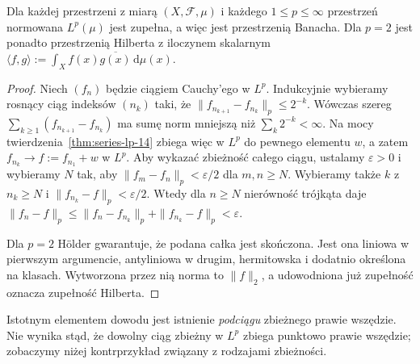 \begin{twierdzenie}
\label{thm:riesz-fischer-14}
Dla każdej przestrzeni z miarą $(X,\mathcal F,\mu)$
i każdego $1\le p\le\infty$ przestrzeń normowana
$L^p(\mu)$ jest zupełna, a więc jest przestrzenią Banacha.
Dla $p=2$ jest ponadto przestrzenią Hilberta
z iloczynem skalarnym
$\langle f,g\rangle:=\int_X f(x)\overline{g(x)}\,\mathrm d\mu(x)$.
\end{twierdzenie}
\begin{proof}
Niech $(f_n)$ będzie ciągiem Cauchy'ego w $L^p$.
Indukcyjnie wybieramy rosnący ciąg indeksów $(n_k)$
taki, że $\|f_{n_{k+1}}-f_{n_k}\|_p\le2^{-k}$.
Wówczas szereg $\sum_{k\ge1}(f_{n_{k+1}}-f_{n_k})$
ma sumę norm mniejszą niż $\sum_k2^{-k}<\infty$.
Na mocy twierdzenia~\ref{thm:series-lp-14}
zbiega więc w $L^p$ do pewnego elementu $w$,
a zatem $f_{n_k}\to f:=f_{n_1}+w$ w $L^p$.
Aby wykazać zbieżność całego ciągu, ustalamy
$\varepsilon>0$ i wybieramy $N$ tak, aby
$\|f_m-f_n\|_p<\varepsilon/2$ dla $m,n\ge N$.
Wybieramy także $k$ z $n_k\ge N$ i
$\|f_{n_k}-f\|_p<\varepsilon/2$.
Wtedy dla $n\ge N$ nierówność trójkąta daje
$\|f_n-f\|_p\le\|f_n-f_{n_k}\|_p+
\|f_{n_k}-f\|_p<\varepsilon$.

Dla $p=2$ Hölder gwarantuje, że podana całka
jest skończona. Jest ona liniowa w pierwszym
argumencie, antyliniowa w drugim, hermitowska
i dodatnio określona na klasach. Wytworzona przez nią
norma to $\|f\|_2$, a udowodniona już zupełność
oznacza zupełność Hilberta.
\end{proof}

\begin{uwaga}
Istotnym elementem dowodu jest istnienie
\emph{podciągu} zbieżnego prawie wszędzie.
Nie wynika stąd, że dowolny ciąg zbieżny w $L^p$
zbiega punktowo prawie wszędzie; zobaczymy niżej
kontrprzykład związany z rodzajami zbieżności.
\end{uwaga}

